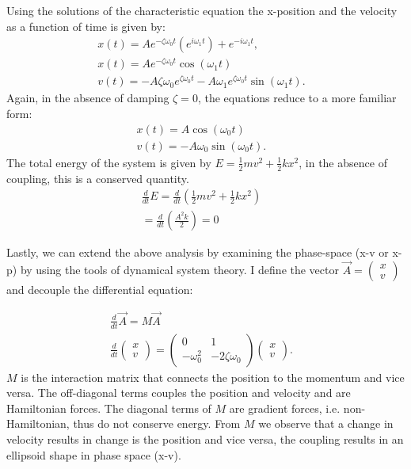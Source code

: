 \documentclass{article}
\begin{document}
Using the solutions of the characteristic equation the x-position and the velocity as a function of time is given by:
\begin{align}
    x(t) = Ae^{-\zeta\omega_0t}(e^{i\omega_1t})+e^{-i\omega_1t}, & \\
    x(t) = Ae^{-\zeta\omega_0t}\cos(\omega_1 t) & \\
    v(t) = -A \zeta \omega_0 e^{\zeta \omega_0 t} - A \omega_1e^{\zeta \omega_0 t}\sin(\omega_1 t).
\end{align}
Again, in the absence of damping $\zeta = 0$, the equations reduce to a more familiar form:
\begin{align}
    x(t) = A\cos(\omega_0 t) & \\
    v(t) = - A \omega_0\sin(\omega_0 t).
\end{align}
The total energy of the system is given by $E=\frac{1}{2}mv^2+\frac{1}{2}kx^2$, in the absence of coupling, this is a conserved quantity.
\begin{align}
    \frac{d}{dt}E = \frac{d}{dt}(\frac{1}{2}mv^2 +\frac{1}{2}kx^2) & \\
    = \frac{d}{dt}(\frac{A^2 k}{2}) = 0
\end{align}

Lastly, we can extend the above analysis by examining the phase-space (x-v or x-p) by using the tools of dynamical system theory. I define the vector $\vec{A} = \begin{pmatrix}
    x\\
    v
\end{pmatrix}$ and decouple the differential equation:

\begin{align}
    \frac{d}{dt}\vec{A} = M\vec{A} & \\
    \frac{d}{dt}
    \begin{pmatrix}
        x\\
        v
    \end{pmatrix}  = \begin{pmatrix}
        0 & 1 \\
         -\omega_0^2 & -2\zeta\omega_0
    \end{pmatrix}\begin{pmatrix}
        x\\
        v
    \end{pmatrix}.
    \label{Eq. damping matrix}
\end{align}
$M$ is the interaction matrix that connects the position to the momentum and vice versa. The off-diagonal terms couples the position and velocity and are Hamiltonian forces. The diagonal terms of $M$ are gradient forces, i.e. non-Hamiltonian, thus do not conserve energy. From $M$ we observe that a change in velocity results in change is the position and vice versa, the coupling results in an ellipsoid shape in phase space (x-v).
\end{document}
